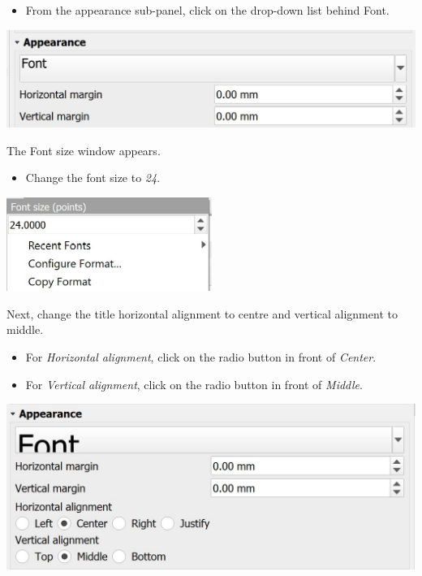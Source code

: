 \documentclass[
  letterpaper,
  DIV=11,
  numbers=noendperiod]{scrreprt}
\providecommand{\tightlist}{%
  \setlength{\itemsep}{0pt}\setlength{\parskip}{0pt}}\usepackage{longtable,booktabs,array}
\begin{document}
\begin{itemize}
\tightlist
\item
  From the appearance sub-panel, click on the drop-down list behind
  Font.
\end{itemize}

\includegraphics{./img04/image85.jpg}

The Font size window appears.

\begin{itemize}
\tightlist
\item
  Change the font size to \emph{24}.
\end{itemize}

\includegraphics[width=2.63542in,height=\textheight]{./img04/image86.jpg}

Next, change the title horizontal alignment to centre and vertical
alignment to middle.

\begin{itemize}
\item
  For \emph{Horizontal alignment}, click on the radio button in front of
  \emph{Center}.
\item
  For \emph{Vertical alignment}, click on the radio button in front of
  \emph{Middle}.
\end{itemize}

\includegraphics{./img04/image87.jpg}
\end{document}
